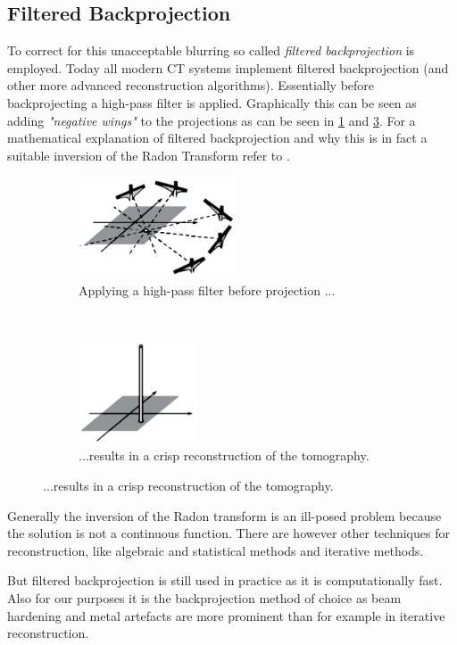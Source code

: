 \subsection{Filtered Backprojection}
\par To correct for this unacceptable blurring so called \emph{filtered backprojection} is employed. Today all modern CT systems implement filtered backprojection (and other more advanced reconstruction algorithms). Essentially before backprojecting a high-pass filter is applied. Graphically this can be seen as adding \emph{"negative wings"} to the projections as can be seen in \ref{zeng3} and \ref{zeng4}. For a mathematical explanation of filtered backprojection and why this is in fact a suitable inversion of the Radon Transform refer to \cite{buzug}.
\begin{figure}[h!]
	\centering
	\begin{subfigure}[b]{0.5\textwidth}
		\centering
		\includegraphics[height=3cm]{images/zeng3_Shopped.png}
		\caption{Applying a high-pass filter before projection ...\cite{zeng}}
		\label{zeng3}
	\end{subfigure}%
	~
	\begin{subfigure}[b]{0.5\textwidth}
		\centering
		\includegraphics[height=3cm]{images/zeng4_Shopped.png}
		\caption{...results in a crisp reconstruction of the tomography.\cite{zeng}}
		\label{zeng4}
	\end{subfigure}%
\end{figure}
\par Generally the inversion of the Radon transform is an ill-posed problem because the solution is not a continuous function. There are however other techniques for reconstruction, like algebraic and statistical methods and iterative methods.\cite{SchlechtGestellteProbleme}\cite{buzug}
\par But filtered backprojection is still used in practice as it is computationally fast. Also for our purposes it is the backprojection method of choice as beam hardening and metal artefacts are more prominent than for example in iterative reconstruction.\cite{buzug}

